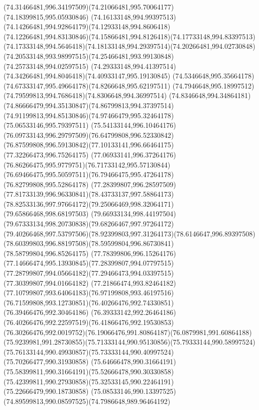 {{	\curveto(74.31466481,996.34197509)(74.21066481,995.70064177)(74.18399815,995.05930846)
	\curveto(74.16133148,994.99397513)(74.14266481,994.92864179)(74.12933148,994.8606418)
	\curveto(74.12266481,994.83130846)(74.15866481,994.8126418)(74.17733148,994.83397513)
	\curveto(74.17333148,994.5646418)(74.18133148,994.29397514)(74.20266481,994.02730848)
	\curveto(74.20533148,993.98997515)(74.25466481,993.99130848)(74.25733148,994.02597515)
	\curveto(74.29333148,994.41397514)(74.34266481,994.8046418)(74.40933147,995.19130845)
	\curveto(74.5346648,995.35664178)(74.67333147,995.49664178)(74.8266648,995.62197511)
	\curveto(74.7946648,995.18997512)(74.79599813,994.7686418)(74.8306648,994.36997514)
	\curveto(74.8346648,994.34864181)(74.86666479,994.35130847)(74.86799813,994.37397514)
	\curveto(74.91199813,994.85130846)(74.97466479,995.32464178)(75.06533146,995.79397511)
	\curveto(75.54133144,996.10464176)(76.09733143,996.29797509)(76.64799808,996.52330842)
	\curveto(76.87599808,996.59130842)(77.10133141,996.66464175)(77.32266473,996.75264175)
	\curveto(77.06933141,996.37264176)(76.86266475,995.9779751)(76.71733142,995.57130844)
	\curveto(76.69466475,995.50597511)(76.79466475,995.47264178)(76.82799808,995.52864178)
	\curveto(77.28399807,996.28597509)(77.81733139,996.96330841)(78.43733137,997.58864173)
	\curveto(78.82533136,997.97664172)(79.25066469,998.32064171)(79.65866468,998.68197503)
	\curveto(79.66933134,998.44197504)(79.67333134,998.20730838)(79.68266467,997.97264172)
	\curveto(79.40266468,997.53797506)(78.92399803,997.31264173)(78.6146647,996.89397508)
	\curveto(78.60399803,996.88197508)(78.59599804,996.86730841)(78.58799804,996.85264175)
	\curveto(77.78399806,996.15264176)(77.14666474,995.13930845)(77.28399807,994.07797515)
	\curveto(77.28799807,994.05664182)(77.29466473,994.03397515)(77.30399807,994.01664182)
	\curveto(77.21866474,993.82464182)(77.10799807,993.64064183)(76.97199808,993.46197516)
	\curveto(76.71599808,993.12730851)(76.40266476,992.74330851)(76.39466476,992.30464186)
	\curveto(76.39333142,992.26464186)(76.40266476,992.22597519)(76.41866476,992.19530853)
	\curveto(76.30266476,992.0019752)(76.19066476,991.80864187)(76.0879981,991.60864188)
	\curveto(75.9239981,991.28730855)(75.71333144,990.95130856)(75.79333144,990.58997524)
	\curveto(75.76133144,990.49930857)(75.73333144,990.40997524)(75.70266477,990.31930858)
	\curveto(75.64666478,990.31664191)(75.58399811,990.31664191)(75.52666478,990.30330858)
	\curveto(75.42399811,990.27930858)(75.32533145,990.22464191)(75.22666479,990.18730858)
	\curveto(75.08533146,990.13397525)(74.89599813,990.08597525)(74.7986648,989.96464192)
}}
